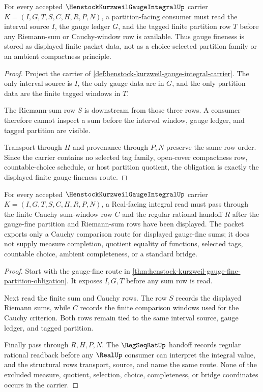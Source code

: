 \begin{theorem}
\label{thm:henstock-kurzweil-gauge-fine-partition-obligation}
For every accepted $\HenstockKurzweilGaugeIntegralUp$ carrier $K=(I,G,T,S,C,H,R,P,N)$, a partition-facing consumer must read the interval source $I$, the gauge ledger $G$, and the tagged finite partition row $T$ before any Riemann-sum or Cauchy-window row is available. Thus gauge fineness is stored as displayed finite packet data, not as a choice-selected partition family or an ambient compactness principle.
\end{theorem}
\begin{proof}
Project the carrier of \autoref{def:henstock-kurzweil-gauge-integral-carrier}. The only interval source is $I$, the only gauge data are in $G$, and the only partition data are the finite tagged windows in $T$.

The Riemann-sum row $S$ is downstream from those three rows. A consumer therefore cannot inspect a sum before the interval window, gauge ledger, and tagged partition are visible.

Transport through $H$ and provenance through $P,N$ preserve the same row order. Since the carrier contains no selected tag family, open-cover compactness row, countable-choice schedule, or host partition quotient, the obligation is exactly the displayed finite gauge-fineness route.
\end{proof}

\begin{theorem}
\label{thm:henstock-kurzweil-cauchy-criterion-obligation}
For every accepted $\HenstockKurzweilGaugeIntegralUp$ carrier $K=(I,G,T,S,C,H,R,P,N)$, a Real-facing integral read must pass through the finite Cauchy sum-window row $C$ and the regular rational handoff $R$ after the gauge-fine partition and Riemann-sum rows have been displayed. The packet exports only a Cauchy comparison route for displayed gauge-fine sums; it does not supply measure completion, quotient equality of functions, selected tags, countable choice, ambient completeness, or a standard bridge.
\end{theorem}
\begin{proof}
Start with the gauge-fine route in \autoref{thm:henstock-kurzweil-gauge-fine-partition-obligation}. It exposes $I,G,T$ before any sum row is read.

Next read the finite sum and Cauchy rows. The row $S$ records the displayed Riemann sums, while $C$ records the finite comparison windows used for the Cauchy criterion. Both rows remain tied to the same interval source, gauge ledger, and tagged partition.

Finally pass through $R,H,P,N$. The $\RegSeqRatUp$ handoff records regular rational readback before any $\RealUp$ consumer can interpret the integral value, and the structural rows transport, source, and name the same route. None of the excluded measure, quotient, selection, choice, completeness, or bridge coordinates occurs in the carrier.
\end{proof}

